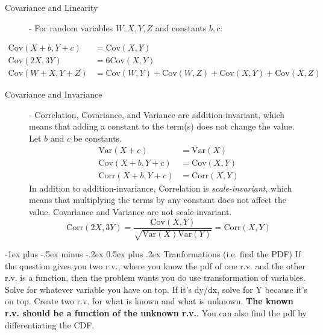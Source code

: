 \documentclass[10pt,landscape]{article}
\makeatletter
\theoremstyle{definition}
\newcommand{\var}{\textrm{Var}}
\newcommand{\cov}{\textrm{Cov}}
\newcommand{\corr}{\textrm{Corr}}
\renewcommand{\section}{\@startsection{section}{1}{0mm}%
                                {-1ex plus -.5ex minus -.2ex}%
                                {0.5ex plus .2ex}%
                                {\normalfont\large\bfseries}}
\makeatother
\begin{document}
\begin{multicols}{3}
\begin{description}
\item [Covariance and Linearity] - For random variables $W, X, Y, Z$ and constants $b, c$:
\end{description}
    \begin{align*}
        \cov(X + b, Y + c) &= \cov(X, Y) \\
        \cov(2X, 3Y) &= 6\cov(X, Y) \\
        \cov(W + X, Y + Z) &= \cov(W, Y) + \cov(W, Z) + \cov(X, Y) + \cov(X, Z)
    \end{align*}
\begin{description}
\item [Covariance and Invariance] - Correlation, Covariance, and Variance are addition-invariant, which means that adding a constant to the term(s) does not change the value. Let $b$ and $c$ be constants.
    \begin{align*}
        \var(X + c) &= \var(X) \\
        \cov(X + b, Y + c) &= \cov(X, Y) \\
        \corr(X + b, Y + c) &= \corr(X, Y) 
    \end{align*}
    In addition to addition-invariance, Correlation is \emph{scale-invariant}, which means that multiplying the terms by any constant does not affect the value. Covariance and Variance are not scale-invariant.
    \[\corr(2X, 3Y) = \frac{\cov(X, Y)}{\sqrt{\var(X)\var(Y)}} = \corr(X, Y)\]

\end{description}


\section{Tranformations (i.e. find the PDF)}
If the question gives you two r.v., where you know the pdf of one r.v. and the other r.v. is a function, then the problem wants you do use transformation of variables. Solve for whatever variable you have on top. If it's dy/dx, solve for Y because it's on top. Create two r.v. for what is known and what is unknown. \textbf{The known r.v. should be a function of the unknown r.v.}. You can also find the pdf by differentiating the CDF.
\begin{description}


\end{description}
\end{multicols}
\end{document}
